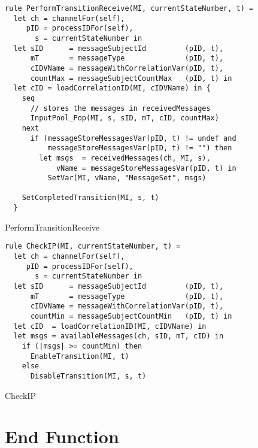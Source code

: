 \begin{listing}[H]
\begin{verbatim}
rule PerformTransitionReceive(MI, currentStateNumber, t) =
  let ch = channelFor(self),
     pID = processIDFor(self),
       s = currentStateNumber in
  let sID      = messageSubjectId         (pID, t),
      mT       = messageType              (pID, t),
      cIDVName = messageWithCorrelationVar(pID, t),
      countMax = messageSubjectCountMax   (pID, t) in
  let cID = loadCorrelationID(MI, cIDVName) in {
    seq
      // stores the messages in receivedMessages
      InputPool_Pop(MI, s, sID, mT, cID, countMax)
    next
      if (messageStoreMessagesVar(pID, t) != undef and
          messageStoreMessagesVar(pID, t) != "") then
        let msgs  = receivedMessages(ch, MI, s),
            vName = messageStoreMessagesVar(pID, t) in
          SetVar(MI, vName, "MessageSet", msgs)

    SetCompletedTransition(MI, s, t)
  }
\end{verbatim}
\caption{PerformTransitionReceive}
\label{lst:asm:PerformTransitionReceive}
\end{listing}




\begin{listing}[H]
\begin{verbatim}
rule CheckIP(MI, currentStateNumber, t) =
  let ch = channelFor(self),
     pID = processIDFor(self),
       s = currentStateNumber in
  let sID      = messageSubjectId         (pID, t),
      mT       = messageType              (pID, t),
      cIDVName = messageWithCorrelationVar(pID, t),
      countMin = messageSubjectCountMin   (pID, t) in
  let cID  = loadCorrelationID(MI, cIDVName) in
  let msgs = availableMessages(ch, sID, mT, cID) in
    if (|msgs| >= countMin) then
      EnableTransition(MI, t)
    else
      DisableTransition(MI, s, t)
\end{verbatim}
\caption{CheckIP}
\label{lst:asm:CheckIP}
\end{listing}





\section{End Function}

